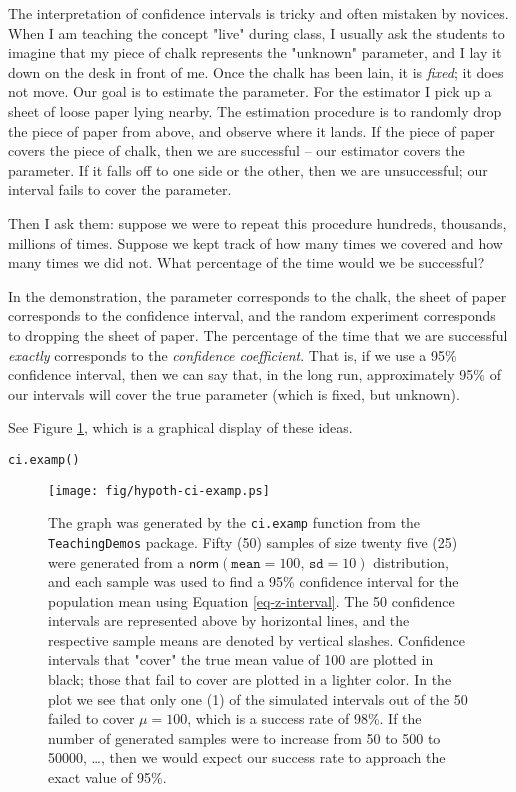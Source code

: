 The interpretation of confidence intervals is tricky and often
mistaken by novices. When I am teaching the concept "live" during
class, I usually ask the students to imagine that my piece of chalk
represents the "unknown" parameter, and I lay it down on the desk in
front of me. Once the chalk has been lain, it is \emph{fixed}; it does not
move. Our goal is to estimate the parameter. For the estimator I pick
up a sheet of loose paper lying nearby. The estimation procedure is to
randomly drop the piece of paper from above, and observe where it
lands. If the piece of paper covers the piece of chalk, then we are
successful -- our estimator covers the parameter. If it falls off to
one side or the other, then we are unsuccessful; our interval fails to
cover the parameter.

Then I ask them: suppose we were to repeat this procedure hundreds,
thousands, millions of times. Suppose we kept track of how many times
we covered and how many times we did not. What percentage of the time
would we be successful?

In the demonstration, the parameter corresponds to the chalk, the
sheet of paper corresponds to the confidence interval, and the random
experiment corresponds to dropping the sheet of paper. The percentage
of the time that we are successful \emph{exactly} corresponds to the
\emph{confidence coefficient}. That is, if we use a 95\% confidence
interval, then we can say that, in the long run, approximately 95\% of
our intervals will cover the true parameter (which is fixed, but
unknown).

See Figure \ref{fig-ci-examp}, which is a graphical display of these ideas.

\begin{verbatim}
ci.examp()
\end{verbatim}

\begin{figure}[ht!]
\centering
\texttt{[image: fig/hypoth-ci-examp.ps]}
\caption[Simulated confidence intervals]{\label{fig-ci-examp}\small The graph was generated by the \texttt{ci.examp} function from the \texttt{TeachingDemos} package. Fifty (50) samples of size twenty five (25) were generated from a \( \mathsf{norm}(\mathtt{mean}=100,\,\mathtt{sd}=10) \) distribution, and each sample was used to find a 95\% confidence interval for the population mean using Equation \eqref{eq-z-interval}. The 50 confidence intervals are represented above by horizontal lines, and the respective sample means are denoted by vertical slashes. Confidence intervals that "cover" the true mean value of 100 are plotted in black; those that fail to cover are plotted in a lighter color. In the plot we see that only one (1) of the simulated intervals out of the 50 failed to cover \(\mu=100\), which is a success rate of 98\%. If the number of generated samples were to increase from 50 to 500 to 50000, \ldots{}, then we would expect our success rate to approach the exact value of 95\%.}
\end{figure}

